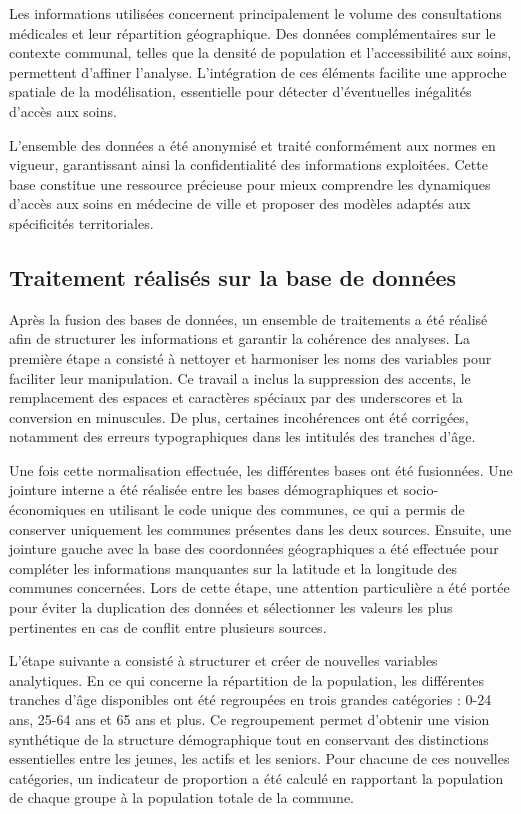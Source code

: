 \documentclass[
]{article}
\begin{document}
Les informations utilisées concernent principalement le volume des
consultations médicales et leur répartition géographique. Des données
complémentaires sur le contexte communal, telles que la densité de
population et l'accessibilité aux soins, permettent d'affiner l'analyse.
L'intégration de ces éléments facilite une approche spatiale de la
modélisation, essentielle pour détecter d'éventuelles inégalités d'accès
aux soins.

L'ensemble des données a été anonymisé et traité conformément aux normes
en vigueur, garantissant ainsi la confidentialité des informations
exploitées. Cette base constitue une ressource précieuse pour mieux
comprendre les dynamiques d'accès aux soins en médecine de ville et
proposer des modèles adaptés aux spécificités territoriales.

\hypertarget{traitement-ruxe9alisuxe9s-sur-la-base-de-donnuxe9es}{%
\subsection{Traitement réalisés sur la base de
données}\label{traitement-ruxe9alisuxe9s-sur-la-base-de-donnuxe9es}}

Après la fusion des bases de données, un ensemble de traitements a été
réalisé afin de structurer les informations et garantir la cohérence des
analyses. La première étape a consisté à nettoyer et harmoniser les noms
des variables pour faciliter leur manipulation. Ce travail a inclus la
suppression des accents, le remplacement des espaces et caractères
spéciaux par des underscores et la conversion en minuscules. De plus,
certaines incohérences ont été corrigées, notamment des erreurs
typographiques dans les intitulés des tranches d'âge.

Une fois cette normalisation effectuée, les différentes bases ont été
fusionnées. Une jointure interne a été réalisée entre les bases
démographiques et socio-économiques en utilisant le code unique des
communes, ce qui a permis de conserver uniquement les communes présentes
dans les deux sources. Ensuite, une jointure gauche avec la base des
coordonnées géographiques a été effectuée pour compléter les
informations manquantes sur la latitude et la longitude des communes
concernées. Lors de cette étape, une attention particulière a été portée
pour éviter la duplication des données et sélectionner les valeurs les
plus pertinentes en cas de conflit entre plusieurs sources.

L'étape suivante a consisté à structurer et créer de nouvelles variables
analytiques. En ce qui concerne la répartition de la population, les
différentes tranches d'âge disponibles ont été regroupées en trois
grandes catégories : 0-24 ans, 25-64 ans et 65 ans et plus. Ce
regroupement permet d'obtenir une vision synthétique de la structure
démographique tout en conservant des distinctions essentielles entre les
jeunes, les actifs et les seniors. Pour chacune de ces nouvelles
catégories, un indicateur de proportion a été calculé en rapportant la
population de chaque groupe à la population totale de la commune.
\end{document}

